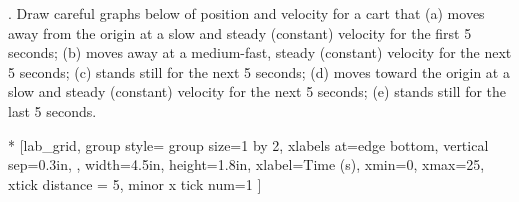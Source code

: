 %
%

. Draw careful graphs below of position and velocity for a cart that (a) moves
away from the origin at a slow and steady (constant) velocity for the first
5 seconds; (b) moves away at a medium-fast, steady (constant) velocity for the
next 5 seconds; (c) stands still for the next 5 seconds; (d) moves toward the
origin at a slow and steady (constant) velocity for the next 5 seconds; (e)
stands still for the last 5 seconds.

\begin{lab_groupplot}*{}
					[lab_grid,
	group style={
		group size=1 by 2,
		xlabels at=edge bottom,
		vertical sep=0.3in,
		},
	width=4.5in, height=1.8in,
	xlabel=Time (s),
	xmin=0, xmax=25,
	xtick distance = 5,
	minor x tick num=1
	]
\nextgroupplot[
	ymin=0,ymax=8, 
	ylabel={Position (m)},
	ylabel_align={-1},
	]
\nextgroupplot[
	ymin=-1,ymax=1, 
	ytick distance = 1, 
	minor y tick num=1, 
	ylabel={Velocity (m/s)},
	]
\end{lab_groupplot}

